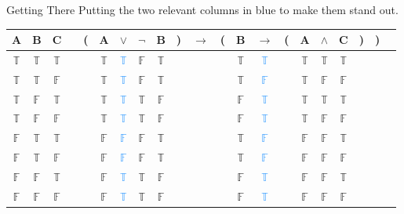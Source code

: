 \documentclass[
  ignorenonframetext,
]{beamer}
\renewcommand{\,}{\text{, }}
\def\True{\mathbb{T}}
\def\False{\mathbb{F}}
\begin{document}
\begin{frame}{Getting There}
\protect\hypertarget{getting-there}{}
Putting the two relevant columns in blue to make them stand out.
\begin{center} \begin{tabular}{@{ }c@{ }@{ }c@{ }@{ }c | c@{ }@{}c@{}@{ }c@{ }@{ }c@{ }@{ }c@{ }@{ }c@{ }@{}c@{}@{ }c@{ }@{}c@{}@{ }c@{ }@{ }c@{ }@{}c@{}@{ }c@{ }@{ }c@{ }@{ }c@{ }@{}c@{}@{}c@{}@{ }c} A & B & C &  & ( & A & $\vee$ & $\neg$ & B & ) & $\rightarrow$ & ( & B & $\rightarrow$ & ( & A & $\wedge$ & C & ) & ) & \\ \hline   $\True$ & $\True$ & $\True$ &  &  & $\True$ & \textcolor{dodgerblue}{$\True$} & $\False$ & $\True$ &  &&  & $\True$ & \textcolor{dodgerblue}{$\True$} &  & $\True$ & $\True$ & $\True$ &  &  & \\  $\True$ & $\True$ & $\False$ &  &  & $\True$ & \textcolor{dodgerblue}{$\True$} & $\False$ & $\True$ &  &&  & $\True$ & \textcolor{dodgerblue}{$\False$} &  & $\True$ & $\False$ & $\False$ &  &  & \\  $\True$ & $\False$ & $\True$ &  &  & $\True$ & \textcolor{dodgerblue}{$\True$} & $\True$ & $\False$ &  &&  & $\False$ & \textcolor{dodgerblue}{$\True$} &  & $\True$ & $\True$ & $\True$ &  &  & \\  $\True$ & $\False$ & $\False$ &  &  & $\True$ & \textcolor{dodgerblue}{$\True$} & $\True$ & $\False$ &  &&  & $\False$ & \textcolor{dodgerblue}{$\True$} &  & $\True$ & $\False$ & $\False$ &  &  & \\  $\False$ & $\True$ & $\True$ &  &  & $\False$ & \textcolor{dodgerblue}{$\False$} & $\False$ & $\True$ &  &&  & $\True$ & \textcolor{dodgerblue}{$\False$} &  & $\False$ & $\False$ & $\True$ &  &  & \\  $\False$ & $\True$ & $\False$ &  &  & $\False$ & \textcolor{dodgerblue}{$\False$} & $\False$ & $\True$ &  &&  & $\True$ & \textcolor{dodgerblue}{$\False$} &  & $\False$ & $\False$ & $\False$ &  &  & \\  $\False$ & $\False$ & $\True$ &  &  & $\False$ & \textcolor{dodgerblue}{$\True$} & $\True$ & $\False$ &  &&  & $\False$ & \textcolor{dodgerblue}{$\True$} &  & $\False$ & $\False$ & $\True$ &  &  & \\  $\False$ & $\False$ & $\False$ &  &  & $\False$ & \textcolor{dodgerblue}{$\True$} & $\True$ & $\False$ &  &&  & $\False$ & \textcolor{dodgerblue}{$\True$} &  & $\False$ & $\False$ & $\False$ &  &  & \\ \end{tabular} \end{center}
\end{frame}
\end{document}
